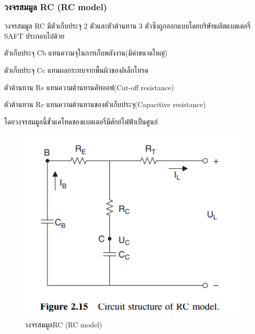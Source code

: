 \subsubsection*{วงจรสมมูล RC (RC model)}
วงจรสมมูล RC มีตัวเก็บประจุ 2 ตัวและตัวต้านทาน 3 ตัวซึ่งถูกออกแบบโดยบริษัทผลิตแบตเตอรี่ SAFT ประกอบไปด้วย
\begin{itemize}
	{\item 	ตัวเก็บประจุ Cb แทนความจุในการเก็บพลังงาน(มีค่าขนาดใหญ่)}
	{\item 	ตัวเก็บประจุ Cc แทนผลกระทบจากพื้นผิวของอิเล็กโทรด}
	{\item 	ตัวต้านทาน Re แทนความต้านทานคัทออฟ(Cut-off resistance)}
	{\item 	ตัวต้านทาน Rc แทนความต้านทานของตัวเก็บประจุ(Capacitive resistance)}
\end{itemize}
โดยวงจรสมมูลนี้ขั้วแคโทดของแบตเตอรี่มีศักย์ไฟฟ้าเป็นศูนย์\newline
\begin{center}
	\begin{figure}[!h]
		\includegraphics[width=0.6\linewidth]{Chapters/img/RC_model.png}
			\centering
			\captionsetup{justification=centering,margin=2cm}
			\caption{วงจรสมมูลRC (RC model)}
	\end{figure}
\end{center}
